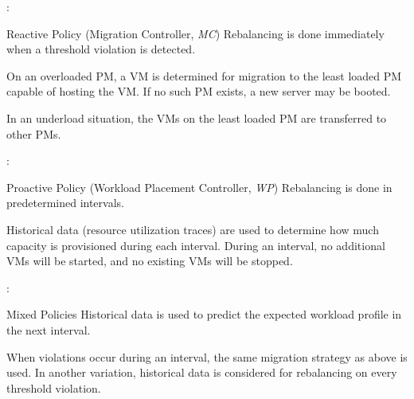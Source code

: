 \documentclass[aspectratio=169]{beamer}
\begin{document}

\begin{frame}{\insertsectionhead: \insertsubsectionhead}
    \begin{Ldescription}
        \item [Reactive Policy \textnormal{(Migration Controller, \textit{MC})}]
            Rebalancing is done immediately when a threshold violation is detected.

            On an overloaded PM, a VM is determined for migration to the least loaded PM capable of hosting the VM.
            If no such PM exists, a new server may be booted.

            In an underload situation, the VMs on the least loaded PM are transferred to other PMs.
    \end{Ldescription}
\end{frame}


\begin{frame}{\insertsectionhead: \insertsubsectionhead}
    \begin{Ldescription}
        \item [Proactive Policy \textnormal{(Workload Placement Controller, \textit{WP})}]
            Rebalancing is done in predetermined intervals.

            Historical data (resource utilization traces) are used to determine how much capacity is provisioned during each interval.
            During an interval, no additional VMs will be started, and no existing VMs will be stopped.
    \end{Ldescription}
\end{frame}


\begin{frame}{\insertsectionhead: \insertsubsectionhead}
    \begin{Ldescription}
        \item [Mixed Policies]
            Historical data is used to predict the expected workload profile in the next interval.

            When violations occur during an interval, the same migration strategy as above is used.
            In another variation, historical data is considered for rebalancing on every threshold violation.
    \end{Ldescription}
\end{frame}

\end{document}
